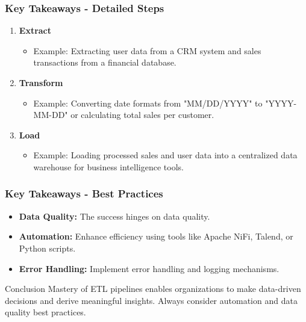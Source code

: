\documentclass[aspectratio=169]{beamer}
\begin{document}
\begin{frame}[fragile]
    \frametitle{Key Takeaways - Detailed Steps}
    \begin{enumerate}
        \item \textbf{Extract}
        \begin{itemize}
            \item Example: Extracting user data from a CRM system and sales transactions from a financial database.
        \end{itemize}
        
        \item \textbf{Transform}
        \begin{itemize}
            \item Example: Converting date formats from "MM/DD/YYYY" to "YYYY-MM-DD" or calculating total sales per customer.
        \end{itemize}
        
        \item \textbf{Load}
        \begin{itemize}
            \item Example: Loading processed sales and user data into a centralized data warehouse for business intelligence tools.
        \end{itemize}
    \end{enumerate}
\end{frame}

\begin{frame}[fragile]
    \frametitle{Key Takeaways - Best Practices}
    \begin{itemize}
        \item \textbf{Data Quality:} The success hinges on data quality.
        \item \textbf{Automation:} Enhance efficiency using tools like Apache NiFi, Talend, or Python scripts.
        \item \textbf{Error Handling:} Implement error handling and logging mechanisms.
    \end{itemize}
    
    \begin{block}{Conclusion}
        Mastery of ETL pipelines enables organizations to make data-driven decisions and derive meaningful insights. Always consider automation and data quality best practices.
    \end{block}
\end{frame}
\end{document}
